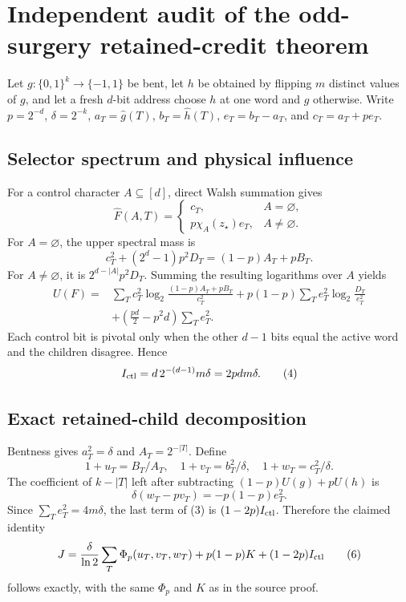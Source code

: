 \section*{Independent audit of the odd-surgery retained-credit theorem}

Let $g:\{0,1\}^k\to\{-1,1\}$ be bent, let $h$ be obtained by
flipping $m$ distinct values of $g$, and let a fresh $d$-bit address choose
$h$ at one word and $g$ otherwise.  Write $p=2^{-d}$,
$\delta=2^{-k}$, $a_T=\widehat g(T)$, $b_T=\widehat h(T)$,
$e_T=b_T-a_T$, and $c_T=a_T+pe_T$.

\subsection*{Selector spectrum and physical influence}

For a control character $A\subseteq[d]$, direct Walsh summation gives
\[
 \widehat F(A,T)=
 \begin{cases}
 c_T,&A=\varnothing,\\
 p\chi_A(z_\star)e_T,&A\ne\varnothing.
 \end{cases}
\tag{1}
\]
For $A=\varnothing$, the upper spectral mass is
\[
 c_T^2+(2^d-1)p^2D_T=(1-p)A_T+pB_T.                     \tag{2}
\]
For $A\ne\varnothing$, it is $2^{d-|A|}p^2D_T$.  Summing
the resulting logarithms over $A$ yields
\begin{align}
 U(F)={}&\sum_Tc_T^2\log_2\frac{(1-p)A_T+pB_T}{c_T^2}
 +p(1-p)\sum_Te_T^2\log_2\frac{D_T}{e_T^2}\\
 &+\left(\frac{pd}{2}-p^2d\right)\sum_Te_T^2.            \tag{3}
\end{align}
Each control bit is pivotal only when the other $d-1$ bits equal the
active word and the children disagree.  Hence
\[
 I_{\rm ctl}=d\,2^{-(d-1)}m\delta=2pdm\delta.            \tag{4}
\]

\subsection*{Exact retained-child decomposition}

Bentness gives $a_T^2=\delta$ and $A_T=2^{-|T|}$.  Define
\[
 1+u_T=B_T/A_T,\quad 1+v_T=b_T^2/\delta,
 \quad 1+w_T=c_T^2/\delta.
\]
The coefficient of $k-|T|$ left after subtracting
$(1-p)U(g)+pU(h)$ is
\[
 \delta(w_T-pv_T)=-p(1-p)e_T^2.                          \tag{5}
\]
Since $\sum_Te_T^2=4m\delta$, the last term of (3) is
$(1-2p)I_{\rm ctl}$.  Therefore the claimed identity
\[
 J=\frac{\delta}{\ln2}\sum_T\Phi_p(u_T,v_T,w_T)
 +p(1-p)K+(1-2p)I_{\rm ctl}                              \tag{6}
\]
follows exactly, with the same $\Phi_p$ and $K$ as in the source proof.

